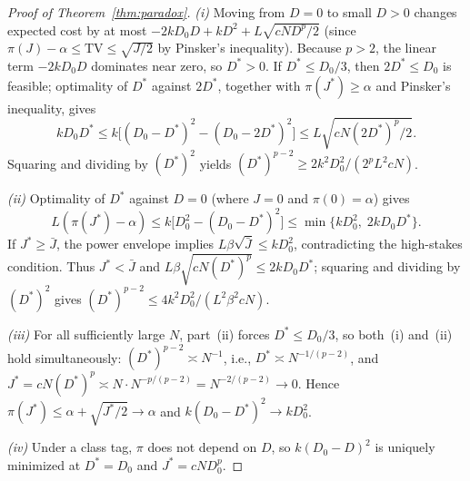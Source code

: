 \documentclass[11pt,letterpaper]{article}
\theoremstyle{definition}
\newcommand{\TV}{\mathrm{TV}}
\begin{document}
\begin{proof}[Proof of Theorem~\ref{thm:paradox}]
\emph{(i)} Moving from $D = 0$ to small $D > 0$ changes expected cost by at most $-2k D_0 D + k D^2 + L \sqrt{c N D^p / 2}$ (since $\pi(J) - \alpha \le \TV \le \sqrt{J/2}$ by Pinsker's inequality). Because $p > 2$, the linear term $-2k D_0 D$ dominates near zero, so $D^* > 0$. If $D^* \le D_0 / 3$, then $2D^* \le D_0$ is feasible; optimality of $D^*$ against $2D^*$, together with $\pi(J^*) \ge \alpha$ and Pinsker's inequality, gives
\[
  k D_0 D^* \le k\bigl[(D_0 - D^*)^2 - (D_0 - 2D^*)^2\bigr] \le L\sqrt{c N (2D^*)^p / 2}.
\]
Squaring and dividing by $(D^*)^2$ yields $(D^*)^{p-2} \ge 2 k^2 D_0^2 / (2^p L^2 c N)$.

\emph{(ii)} Optimality of $D^*$ against $D = 0$ (where $J = 0$ and $\pi(0) = \alpha$) gives
\[
  L(\pi(J^*) - \alpha) \le k\bigl[D_0^2 - (D_0 - D^*)^2\bigr] \le \min\{k D_0^2,\; 2 k D_0 D^*\}.
\]
If $J^* \ge \bar{J}$, the power envelope implies $L \beta \sqrt{\bar{J}} \le k D_0^2$, contradicting the high-stakes condition. Thus $J^* < \bar{J}$ and $L \beta \sqrt{c N (D^*)^p} \le 2 k D_0 D^*$; squaring and dividing by $(D^*)^2$ gives $(D^*)^{p-2} \le 4 k^2 D_0^2 / (L^2 \beta^2 c N)$.

\emph{(iii)} For all sufficiently large $N$, part~(ii) forces $D^* \le D_0 / 3$, so both~(i) and~(ii) hold simultaneously: $(D^*)^{p-2} \asymp N^{-1}$, i.e., $D^* \asymp N^{-1/(p-2)}$, and $J^* = c N (D^*)^p \asymp N \cdot N^{-p/(p-2)} = N^{-2/(p-2)} \to 0$. Hence $\pi(J^*) \le \alpha + \sqrt{J^*/2} \to \alpha$ and $k(D_0 - D^*)^2 \to k D_0^2$.

\emph{(iv)} Under a class tag, $\pi$ does not depend on $D$, so $k(D_0 - D)^2$ is uniquely minimized at $D^* = D_0$ and $J^* = c N D_0^p$.
\end{proof}
\end{document}
